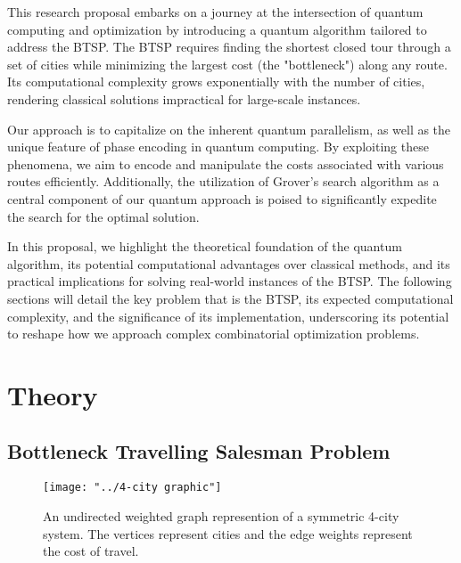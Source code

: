 \documentclass[twocolumn,showpacs,preprintnumbers,amsmath,amssymb]{revtex4}
\begin{document}
		This research proposal embarks on a journey at the intersection of quantum computing and optimization by introducing a quantum algorithm tailored to address the BTSP. The BTSP requires finding the shortest closed tour through a set of cities while minimizing the largest cost (the "bottleneck") along any route. Its computational complexity grows exponentially with the number of cities, rendering classical solutions impractical for large-scale instances.
		
		Our approach is to capitalize on the inherent quantum parallelism, as well as the unique feature of phase encoding in quantum computing. By exploiting these phenomena, we aim to encode and manipulate the costs associated with various routes efficiently. Additionally, the utilization of Grover's search algorithm as a central component of our quantum approach is poised to significantly expedite the search for the optimal solution.
		
		In this proposal, we highlight the theoretical foundation of the quantum algorithm, its potential computational advantages over classical methods, and its practical implications for solving real-world instances of the BTSP. The following sections will detail the key problem that is the BTSP, its expected computational complexity, and the significance of its implementation, underscoring its potential to reshape how we approach complex combinatorial optimization problems.
		
		
		\section{Theory}
		
		\subsection{Bottleneck Travelling Salesman Problem}
		
		\begin{figure}[!h]
			\centering
			\texttt{[image: "../4-city graphic"]}
			\caption{An undirected weighted graph represention of a  symmetric 4-city system.  The vertices represent cities and the edge weights represent the cost of travel. }
			\label{fig:4-city-graphic}
		\end{figure}		
		
\end{document}
